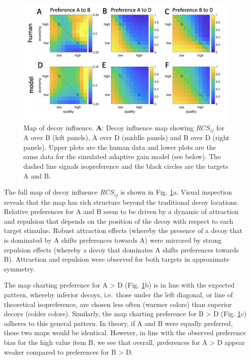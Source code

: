 \documentclass[a4paper, nobind]{templates/ociamthesis}
\begin{document}
\begin{figure}

{\centering \includegraphics[width=1\linewidth]{figures/decoy-map} 

}

\caption[Map of decoy influence]{Map of decoy influence. $\textbf{A:}$ Decoy influence map showing $RCS_{ij}$ for A over B (left panels), A over D (middle panels) and B over D (right panels). Upper plots are the human data and lower plots are the same data for the simulated adaptive gain model (see below). The dashed line signals isopreference and the black circles are the targets A and B.}\label{fig:decoy-map}
\end{figure}

The full map of decoy influence \(RCS_{ij}\) is shown in Fig. \ref{fig:decoy-map}a. Visual inspection reveals that the map has rich structure beyond the traditional decoy locations. Relative preferences for A and B seem to be driven by a dynamic of attraction and repulsion that depends on the position of the decoy with respect to each target stimulus. Robust attraction effects (whereby the presence of a decoy that is dominated by A shifts preferences towards A) were mirrored by strong repulsion effects (whereby a decoy that dominates A shifts preferences towards B). Attraction and repulsion were observed for both targets in approximate symmetry.

The map charting preference for A \textgreater{} D (Fig. \ref{fig:decoy-map}b) is in line with the expected pattern, whereby inferior decoys, i.e.~those under the left diagonal, or line of theoretical isopreference, are chosen less often (warmer colors) than superior decoys (colder colors). Similarly, the map charting preference for B \textgreater{} D (Fig. \ref{fig:decoy-map}c) adheres to this general pattern. In theory, if A and B were equally preferred, these two maps would be identical. However, in line with the observed preference bias for the high value item B, we see that overall, preferences for A \textgreater{} D appear weaker compared to preferences for B \textgreater{} D.
\end{document}

